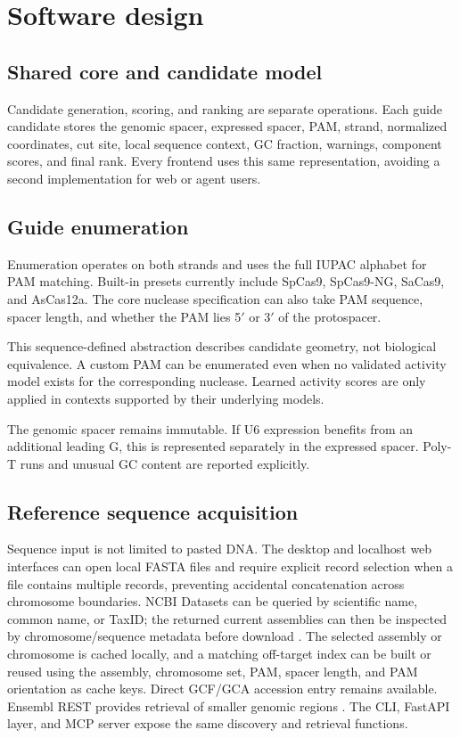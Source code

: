 \documentclass[11pt]{article}
\begin{document}
\section{Software design}

\subsection{Shared core and candidate model}

Candidate generation, scoring, and ranking are separate operations. Each guide candidate stores the genomic spacer, expressed spacer, PAM, strand, normalized coordinates, cut site, local sequence context, GC fraction, warnings, component scores, and final rank. Every frontend uses this same representation, avoiding a second implementation for web or agent users.

\subsection{Guide enumeration}

Enumeration operates on both strands and uses the full IUPAC alphabet for PAM matching. Built-in presets currently include SpCas9, SpCas9-NG, SaCas9, and AsCas12a. The core nuclease specification can also take PAM sequence, spacer length, and whether the PAM lies 5$'$ or 3$'$ of the protospacer.

This sequence-defined abstraction describes candidate geometry, not biological equivalence. A custom PAM can be enumerated even when no validated activity model exists for the corresponding nuclease. Learned activity scores are only applied in contexts supported by their underlying models.

The genomic spacer remains immutable. If U6 expression benefits from an additional leading G, this is represented separately in the expressed spacer. Poly-T runs and unusual GC content are reported explicitly.


\subsection{Reference sequence acquisition}

Sequence input is not limited to pasted DNA. The desktop and localhost web interfaces can open local FASTA files and require explicit record selection when a file contains multiple records, preventing accidental concatenation across chromosome boundaries. NCBI Datasets can be queried by scientific name, common name, or TaxID; the returned current assemblies can then be inspected by chromosome/sequence metadata before download \citep{ncbiDatasets2026}. The selected assembly or chromosome is cached locally, and a matching off-target index can be built or reused using the assembly, chromosome set, PAM, spacer length, and PAM orientation as cache keys. Direct GCF/GCA accession entry remains available. Ensembl REST provides retrieval of smaller genomic regions \citep{ensemblRest2026}. The CLI, FastAPI layer, and MCP server expose the same discovery and retrieval functions.
\end{document}

